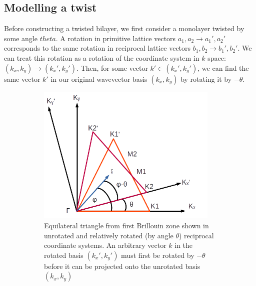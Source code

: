 \documentclass[12pt]{report} %
\begin{document}
\subsection*{Modelling a twist}

  Before constructing a twisted bilayer, we first consider a monolayer twisted by some angle $theta$. A rotation in primitive lattice vectors $a_1, a_2 \rightarrow a_1', a_2'$ corresponds to the same rotation in reciprocal lattice vectors $b_1, b_2 \rightarrow b_1', b_2'$. We can treat this rotation as a rotation of the coordinate system in $k$ space: $(k_x, k_y) \rightarrow (k_x', k_y')$. Then, for some vector $k' \in (k_x', k_y')$, we can find the same vector $k'$ in our original wavevector basis $(k_x, k_y)$ by rotating it by $-\theta$.

\begin{figure}[t]
\centering
  \begin{subfigure}[t]{0.475\textwidth}
    \centering
    \includegraphics[width=0.95\textwidth]{twisted_triangles.png}
    \caption{
      Equilateral triangle from first Brillouin zone shown in unrotated and relatively rotated (by angle $\theta$) reciprocal coordinate systems. An arbitrary vector $k$ in the rotated basis $(k_x', k_y')$ must first be rotated by $-\theta$ before it can be projected onto the unrotated basis $(k_x, k_y)$
    }
    \label{twisted_triangles}
  \end{subfigure}
  \hfill
  \begin{subfigure}[t]{0.475\textwidth}
    \centering

\end{subfigure}
\end{figure}
\end{document}
